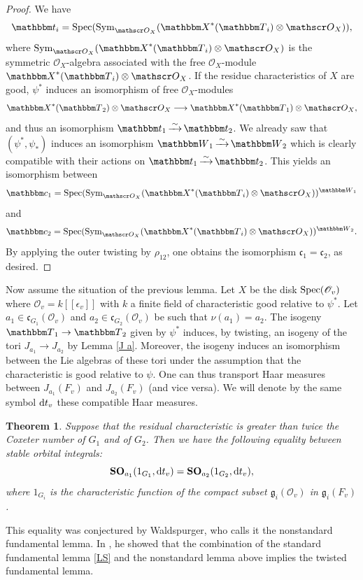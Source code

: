 \documentclass[12pt,english]{smfart}
\numberwithin{equation}{subsection}
\newtheorem{theoreme}[equation]{Theorem}
\theoremstyle{remark}
\newcommand\rta{\rightarrow}
\newcommand\calO{{\mathscr O}}
\newcommand\frakg{{\mathfrak g}}
\newcommand\frakc{{\mathfrak c}}
\newcommand\bbW{{\mathbbm W}}
\newcommand\bbT{{\mathbbm T}}
\newcommand\bbt{{\mathbbm t}}
\newcommand\bbc{{\mathbbm c}}
\newcommand\bbX{{\mathbbm X}}
\newcommand\Spec{{\rm Spec}}
\newcommand\isom{\,\smash{\mathop{\hbox to 5mm{\rightarrowfill}}
    \limits^\sim}\,}
\begin{document}
\begin{proof}
We have
$$\bbt_i=\Spec({\rm Sym}_{\calO_X}(\bbX^*(\bbT_i)\otimes \calO_X)),$$
where ${\rm Sym}_{\calO_X}(\bbX^*(\bbT_i)\otimes \calO_X)$ is the symmetric $\calO_X$-algebra associated with the free $\calO_X$-module $\bbX^*(\bbT_i)\otimes \calO_X$. If the residue characteristics of $X$ are good, $\psi^*$ induces an isomorphism of free $\calO_X$-modules
$$\bbX^*(\bbT_2)\otimes \calO_X \longrightarrow \bbX^*(\bbT_1)\otimes \calO_X,$$
and thus an isomorphism $\bbt_1 \isom \bbt_2$. We already saw that $(\psi^*,\psi_*)$ induces an isomorphism $\bbW_1\isom \bbW_2$ which is clearly compatible with their actions on $\bbt_1\isom \bbt_2$. This yields an isomorphism between
$$\bbc_1=\Spec({\rm Sym}_{\calO_X}(\bbX^*(\bbT_i)\otimes \calO_X))^{\bbW_{1}}$$
and
 $$\bbc_2=\Spec({\rm Sym}_{\calO_X}(\bbX^*(\bbT_i)\otimes
\calO_X))^{\bbW_{2}}.$$
By applying the outer twisting by $\rho_{12}$, one obtains the isomorphism $\frakc_1 =\frakc_2$, as desired.
\end{proof}

Now assume the situation of the previous lemma. Let $X$ be the disk $\Spec(\calO_v)$ where $\calO_v=k[[\epsilon_v]]$ with $k$ a finite field of characteristic good relative to $\psi^*$. Let $a_1\in \frakc_{G_1}(\calO_v)$ and $a_2\in\frakc_{G_2}(\calO_v)$ be such that $\nu(a_1)=a_2$. The isogeny $\bbT_1\rightarrow \bbT_2$ given by $\psi^*$ induces, by twisting, an isogeny of the tori $J_{a_1}\rta J_{a_2}$ by Lemma \ref{J a}. Moreover, the isogeny induces an isomorphism between the Lie algebras of these tori under the assumption that the characteristic is good relative to $\psi$. One can thus transport Haar measures between $J_{a_1}(F_v)$ and $J_{a_2}(F_v)$ (and vice versa). We will denote by the same symbol ${\rm d}t_v$ these compatible Haar measures.

\begin{theoreme}\label{Waldspurger}
Suppose that the residual characteristic is greater than twice the Coxeter number of $G_1$ and of $G_2$. Then we have the following equality between stable orbital integrals:
$$
{\bf SO}_{a_1}(1_{G_1},{\rm d}t_v)= {\bf SO}_{a_2}(1_{G_2},{\rm d}t_v),
$$
where $1_{G_i}$ is the characteristic function of the compact subset $\frakg_i(\calO_v)$ in $\frakg_i(F_v)$.
\end{theoreme}

This equality was conjectured by Waldspurger, who calls it the nonstandard fundamental lemma. In \cite{W-tordu}, he showed that the combination of the standard fundamental lemma \ref{LS} and the nonstandard lemma above implies the twisted fundamental lemma.
\end{document}

